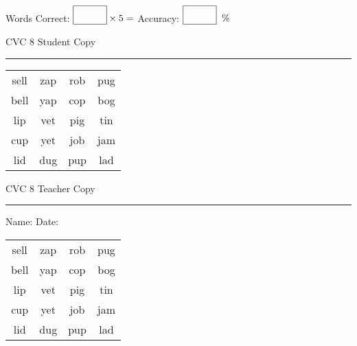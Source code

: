 \documentclass{memoir}
\begin{document}
\normalsize

Words Correct: $\fbox{\phantom{\huge 100}} \times 5 = $ Accuracy: $\fbox{\phantom{\huge 100}}\;\; \%$ 

\vfill

\newpage


\footnotesize \noindent
CVC 8 \hfill Student Copy
\smallskip
\hrule

\huge

\setlength{\tabcolsep}{14pt}
\def\arraystretch{2}

{\selectfont


\begin{vplace}[0.5]
\begin{center}
\begin{tabular}{cccc}
sell & zap & rob & pug \\
bell & yap & cop & bog \\
lip & vet & pig & tin \\
cup & yet & job & jam \\
lid & dug & pup & lad \\
\end{tabular}
\end{center}
\end{vplace}

}

\newpage

\footnotesize \noindent
CVC 8 \hfill Teacher Copy
\smallskip
\hrule

\normalsize

\vfill

\noindent
Name: \underline{\hspace{1.75in}} \hfill Date: \underline{\hspace{1in}}

\huge

{\selectfont


\begin{vplace}[0.5]
\begin{center}
\begin{tabular}{cccc}
sell & zap & rob & pug \\
bell & yap & cop & bog \\
lip & vet & pig & tin \\
cup & yet & job & jam \\
lid & dug & pup & lad \\
\end{tabular}
\end{center}
\end{vplace}



}
\end{document}

